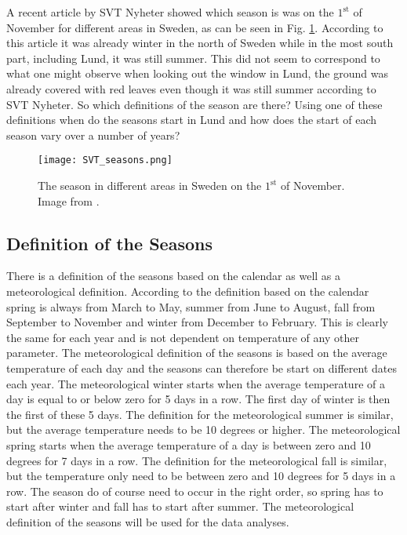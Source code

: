 

A recent article by SVT Nyheter showed which season is was on the $1^\text{st}$ of November for different areas in Sweden, as can be seen in Fig. \ref{fig:SVT}. According to this article it was already winter in the north of Sweden while in the most south part, including Lund, it was still summer. This did not seem to correspond to what one might observe when looking out the window in Lund, the ground was already covered with red leaves even though it was still summer according to SVT Nyheter. So which definitions of the season are there? Using one of these definitions when do the seasons start in Lund and how does the start of each season vary over a number of years?

\begin{figure}[h!]
\centering
\texttt{[image: SVT\_seasons.png]}
\caption{The season in different areas in Sweden on the $1^\text{st}$ of November. Image from \cite{SVT}.}
\label{fig:SVT}
\end{figure}

\subsection{Definition of the Seasons}

There is a definition of the seasons based on the calendar as well as a meteorological definition. According to the definition based on the calendar spring is always from March to May, summer from June to August, fall from September to November and winter from December to February. This is clearly the same for each year and is not dependent on temperature of any other parameter. The meteorological definition of the seasons is based on the average temperature of each day and the seasons can therefore be start on different dates each year. The meteorological winter starts when the average temperature of a day is equal to or below zero for 5 days in a row. The first day of winter is then the first of these 5 days.  The definition for the meteorological summer is similar, but the average temperature needs to be 10 degrees or higher. The meteorological spring starts when the average temperature of a day is between zero and 10 degrees for 7 days in a row. The definition for the meteorological fall is similar, but the temperature only need to be between zero and 10 degrees for 5 days in a row. The season do of course need to occur in the right order, so spring has to start after winter and fall has to start after summer. The meteorological definition of the seasons will be used for the data analyses. 


